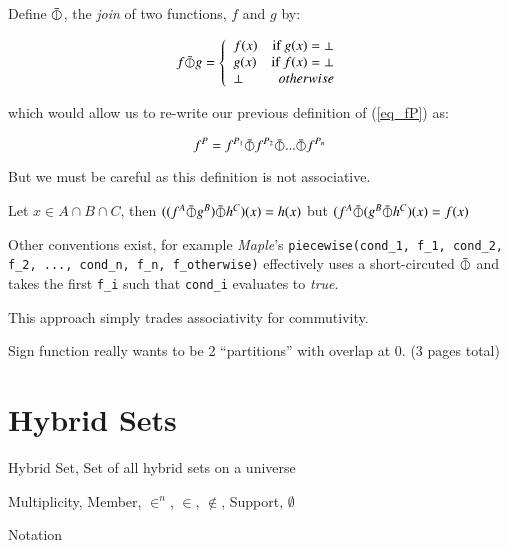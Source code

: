 \begin{definition}
Define $\bar{\varobar}$, the \emph{join} of two functions, $f$ and $g$ by:

\begin{equation}
f \bar{\varobar} g =  
  \left\{
     \begin{array}{lr}
       f(x) & \text{if } g(x) = \bot \\
       g(x) & \text{if } f(x) = \bot \\
       \bot & otherwise
     \end{array}
   \right.
\end{equation}
\end{definition}

which would allow us to re-write our previous definition of (\ref{eq_fP}) as:

\begin{equation}
f^P = f^{P_1} \bar{\varobar} f^{P_2} \bar{\varobar} ... \bar{\varobar} f^{P_n}
\end{equation}

But we must be careful as this definition is not associative.

Let $x \in A \cap B \cap C$, then $( (f^A \bar{\varobar} g^B ) \bar{\varobar} h^C )(x) = h(x)$ but $( f^A \bar{\varobar} ( g^B \bar{\varobar} h^C )(x) = f(x)$

Other conventions exist, for example \emph{Maple}'s 
\texttt{piecewise(cond\_1, f\_1, cond\_2, f\_2, ..., cond\_n, f\_n, f\_otherwise)} 
effectively uses a short-circuted $\bar{\varobar}$ 
and takes the first \texttt{f\_i} such that \texttt{cond\_i} evaluates to \emph{true}.

This approach simply trades associativity for commutivity.

Sign function really wants to be 2 ``partitions'' with overlap at 0. (3 pages total)

\newpage \addtocounter{page}{2}

\section{Hybrid Sets}

\begin{definition}
Hybrid Set, Set of all hybrid sets on a universe
\end{definition}

\begin{definition}
Multiplicity, Member, $\in^n$, $\in$, $\notin$, Support, $\emptyset$
\end{definition}

Notation

